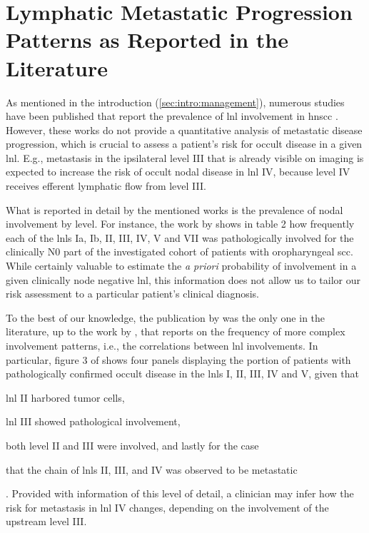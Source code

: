 \documentclass[\relativeRoot/main.tex]{subfiles}
\begin{document}
\section[Progression Patterns in the Literature]{Lymphatic Metastatic Progression Patterns as Reported in the Literature}
\label{sec:previous_work:sanguineti}

As mentioned in the introduction (\cref{sec:intro:management}), numerous studies have been published that report the prevalence of \gls{lnl} involvement in \gls{hnscc} \cite{candela_patterns_1990,shah_patterns_1990,woolgar_histological_1999,woolgar_topography_2007,chao_determination_2002,vauterin_patterns_2006,razfar_incidence_2009,ho_patterns_2012,bauwens_prevalence_2021}. However, these works do not provide a quantitative analysis of metastatic disease progression, which is crucial to assess a patient's risk for occult disease in a given \gls{lnl}. E.g., metastasis in the ipsilateral level III that is already visible on imaging is expected to increase the risk of occult nodal disease in \gls{lnl} IV, because level IV receives efferent lymphatic flow from level III.

What is reported in detail by the mentioned works is the prevalence of nodal involvement by level. For instance, the work by  shows in table 2 how frequently each of the \glspl{lnl} Ia, Ib, II, III, IV, V and VII was pathologically involved for the clinically N0 part of the investigated cohort of patients with oropharyngeal \gls{scc}. While certainly valuable to estimate the \emph{a priori} probability of involvement in a given clinically node negative \gls{lnl}, this information does not allow us to tailor our risk assessment to a particular patient's clinical diagnosis.

To the best of our knowledge, the publication by  was the only one in the literature, up to the work by , that reports on the frequency of more complex involvement patterns, i.e., the correlations between \gls{lnl} involvements. In particular, figure 3 of  shows four panels displaying the portion of patients with pathologically confirmed occult disease in the \glspl{lnl} I, II, III, IV and V, given that
\begin{enumerate*}[label={(\alph*)}]
    \item \gls{lnl} II harbored tumor cells,
    \item \gls{lnl} III showed pathological involvement,
    \item both level II and III were involved, and lastly for the case
    \item that the chain of \glspl{lnl} II, III, and IV was observed to be metastatic
\end{enumerate*}. Provided with information of this level of detail, a clinician may infer how the risk for metastasis in \gls{lnl} IV changes, depending on the involvement of the upstream level III.
\end{document}
